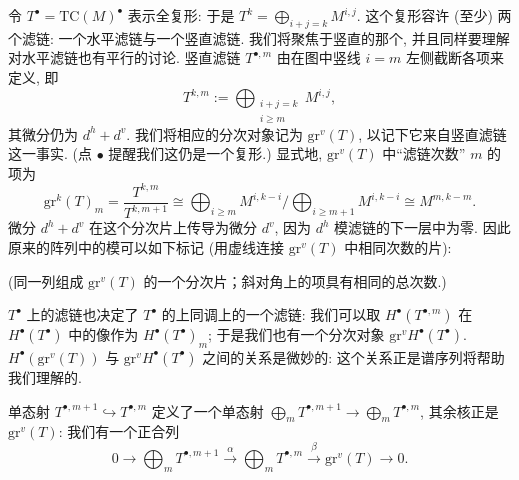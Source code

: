 令 $T^\bullet=\mathrm{TC}(M)^\bullet$ 表示全复形: 于是 $T^k=\bigoplus_{i+j=k}M^{i,j}$. 这个复形容许 (至少) 两个滤链: 一个水平滤链与一个竖直滤链. 我们将聚焦于竖直的那个, 并且同样要理解对水平滤链也有平行的讨论. 竖直滤链 $T^{\bullet,m}$ 由在图中竖线 $i=m$ 左侧截断各项来定义, 即
\[
T^{k,m}:=\bigoplus_{\substack{i+j=k\\ i\ge m}} M^{i,j},
\]
其微分仍为 $d^h+d^v$. 我们将相应的分次对象记为 $\mathrm{gr}^v(T)$, 以记下它来自竖直滤链这一事实. (点 $\bullet$ 提醒我们这仍是一个复形.) 显式地, $\mathrm{gr}^v(T)$ 中“滤链次数” $m$ 的项为
\[
\mathrm{gr}^k(T)_m = \frac{T^{k,m}}{T^{k,m+1}} \cong \bigoplus_{i\ge m}M^{i,k-i}\Big/\bigoplus_{i\ge m+1}M^{i,k-i} \cong M^{m,k-m}.
\]
微分 $d^h+d^v$ 在这个分次片上传导为微分 $d^v$, 因为 $d^h$ 模滤链的下一层中为零. 因此原来的阵列中的模可以如下标记 (用虚线连接 $\mathrm{gr}^v(T)$ 中相同次数的片):
\begin{center}
\end{center}
(同一列组成 $\mathrm{gr}^v(T)$ 的一个分次片；斜对角上的项具有相同的总次数.)

$T^\bullet$ 上的滤链也决定了 $T^\bullet$ 的上同调上的一个滤链: 我们可以取 $H^\bullet(T^{\bullet,m})$ 在 $H^\bullet(T^\bullet)$ 中的像作为 $H^\bullet(T^\bullet)_m$; 于是我们也有一个分次对象 $\mathrm{gr}^v H^\bullet(T^\bullet)$. $H^\bullet(\mathrm{gr}^v(T))$ 与 $\mathrm{gr}^v H^\bullet(T^\bullet)$ 之间的关系是微妙的: 这个关系正是谱序列将帮助我们理解的.

单态射 $T^{\bullet,m+1}\hookrightarrow T^{\bullet,m}$ 定义了一个单态射 $\bigoplus_m T^{\bullet,m+1}\to\bigoplus_m T^{\bullet,m}$, 其余核正是 $\mathrm{gr}^v(T)$: 我们有一个正合列
\begin{equation*}\tag{$\dagger$}
0 \longrightarrow \bigoplus_m T^{\bullet,m+1} \xrightarrow{\ \alpha\ } \bigoplus_m T^{\bullet,m} \xrightarrow{\ \beta\ } \mathrm{gr}^v(T) \longrightarrow 0 .
\end{equation*}

